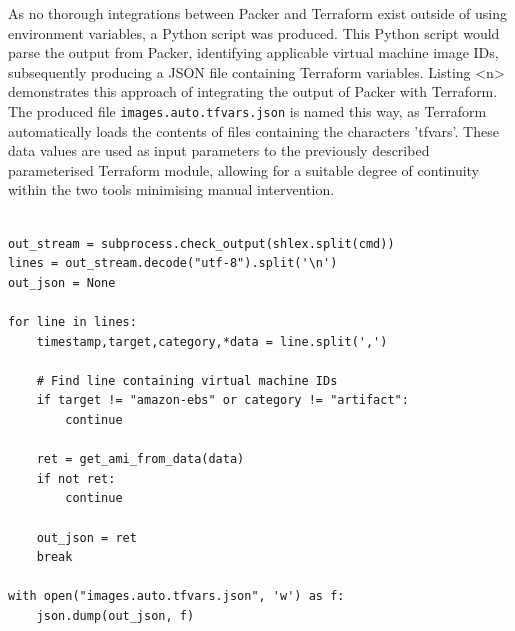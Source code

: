 \documentclass{l4proj}
\begin{document}
As no thorough integrations between Packer and Terraform exist outside of using environment variables, a Python script was produced. This Python script would parse the output from Packer, identifying applicable virtual machine image IDs, subsequently producing a JSON file containing Terraform variables. Listing <n> demonstrates this approach of integrating the output of Packer with Terraform. The produced file \lstinline{images.auto.tfvars.json} is named this way, as Terraform automatically loads the contents of files containing the characters 'tfvars'. These data values are used as input parameters to the previously described parameterised Terraform module, allowing for a suitable degree of continuity within the two tools minimising manual intervention.

\begin{lstlisting}[caption={A demonstration of extracting produced virtual machine image IDs from packer, subsequently producing a data file amenable for use within Terraform.}]

out_stream = subprocess.check_output(shlex.split(cmd))
lines = out_stream.decode("utf-8").split('\n')
out_json = None

for line in lines:
    timestamp,target,category,*data = line.split(',')
    
    # Find line containing virtual machine IDs
    if target != "amazon-ebs" or category != "artifact":
        continue
    
    ret = get_ami_from_data(data)
    if not ret:
        continue

    out_json = ret
    break

with open("images.auto.tfvars.json", 'w') as f:
    json.dump(out_json, f)

\end{lstlisting}
\end{document}
